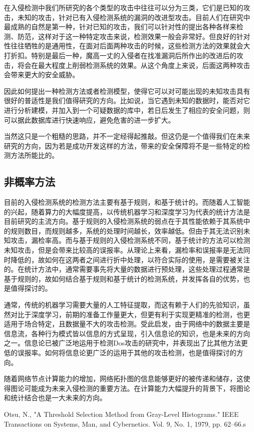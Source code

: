 \documentclass[12pt]{article} %
\begin{document}
在入侵检测中我们所研究的各个类型的攻击中往往可以分为三类，它们是已知的攻击，未知的攻击，针对已有入侵检测系统的漏洞的改进型攻击。目前人们在研究中最成熟的自然是第一种，针对已知的攻击，我们可以针对性的提出各种各样来检测、防范，这样对于这一种特定攻击来说，检测效果一般会非常好。但良好的针对性往往牺牲的是通用性，在面对后面两种攻击的时候，这些检测方法的效果就会大打折扣。特别是最后一种，魔高一丈的入侵者在找准漏洞后所作出的改进后的攻击，将会在最大程度上削弱检测系统的效果。从这个角度上来说，后面这两种攻击会带来更大的安全威胁。

因此如何提出一种检测方法或者检测模型，使得它可以对可能出现的未知攻击具有很好的普适性是我们值得研究的方向。比如说，当它遇到未知的数据时，能否对它进行分析建模，并加入到一个可疑数据的库中，若日后发生了相应的安全问题，则可以据此数据库进行快速响应，避免危害的进一步扩大。

当然这只是一个粗糙的思路，并不一定经得起推敲。但这仍是一个值得我们在未来研究的方向，因为若是成功开发这样的方法，带来的安全保障将不是一些特定的检测方法所能比的。

\subsection{非概率方法}
\label{nonprob}

目前的入侵检测系统的检测方法主要有基于规则，和基于统计的。而随着人工智能的兴起，随着算力的大幅度提高，以传统机器学习和深度学习为代表的统计方法是目前研究的主流方向。基于规则的入侵检测系统的弱点在于其性能依赖于其系统中的规则数目，而规则越多，系统的处理时间越长，效率越低。但由于其无法识别未知攻击，漏检率高。而与基于规则的入侵检测系统不同，基于统计的方法可以检测未知攻击，但是会带来比较高的误报率。从理论上来看，漏检率和误报率是无法同时降低的，故如何在这两者之间进行折中处理，以符合实际的使用，是需要被关注的。在统计方法中，通常需要事先将大量的数据进行预处理，这些处理过程通常是基于规则的，故如何结合基于规则和基于统计的检测系统，并发挥各自的优势，也是值得探讨的。

通常，传统的机器学习需要大量的人工特征提取，而这有赖于人们的先验知识，虽然对比于深度学习，前期的准备工作量更大，但更有利于实现更精准的检测，也更适用于场合特定，且数据量不大的攻击检测。受此启发，由于网络中的数据主要是信息流，各种行为模式皆以信息的方式呈现，引入信息论的知识，也是未来的方向之一。信息论已被广泛地运用于检测Dos攻击的研究中，并表现出了比其他方法更低的误报率。如何将信息论更广泛的运用于其他的攻击检测，也是值得探讨的方向。

随着网络节点计算能力的增加，网络拓扑图的信息能够更好的被传递和储存，这使得图论可能成为未来入侵检测的重要方法。在计算能力大幅提升的背景下，将图论和统计结合也是一大未来的方向。

\begin{thebibliography}{99}

 Otsu, N., "A Threshold Selection Method from Gray-Level Histograms." IEEE Transactions on Systems, Man, and Cybernetics. Vol. 9, No. 1, 1979, pp. 62–66.s

\end{thebibliography}
\end{document}
